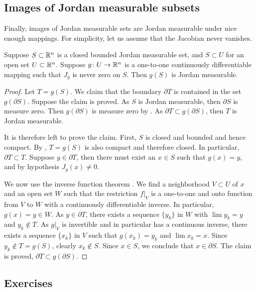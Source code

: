 \subsection{Images of Jordan measurable subsets}

Finally, images of Jordan measurable sets are Jordan measurable under
nice enough mappings.  For simplicity, let us assume that the Jacobian
never vanishes.

\begin{prop} \label{prop:imagejordanmeas}
Suppose $S \subset {\mathbb{R}}^n$ is a closed bounded Jordan measurable set,
and $S \subset U$ for an open set $U \subset {\mathbb{R}}^n$.
Suppose
$g \colon U \to {\mathbb{R}}^n$ is a one-to-one
continuously differentiable mapping such that
$J_g$ is never zero on $S$.
Then $g(S)$ is Jordan measurable.
\end{prop}

\begin{proof}
Let $T = g(S)$.
We claim that the boundary $\partial T$ is contained in the
set $g(\partial S)$.  Suppose the claim is proved.
As $S$ is Jordan measurable, then
$\partial S$ is measure zero.  Then  $g(\partial S)$ is measure
zero by .  As $\partial T \subset g(\partial
S)$, then $T$ is Jordan measurable.

It is therefore left to prove the claim.  First, $S$ is closed and bounded
and hence compact.  By 
,
$T = g(S)$ is
also compact and therefore closed.  In particular, $\partial T \subset T$.
Suppose $y \in \partial T$, then there must exist an
$x \in S$
such that $g(x) = y$, and by hypothesis $J_g(x) \not= 0$.

We now use the inverse function theorem .  We find 
a neighborhood $V \subset U$ of $x$ and an open set $W$ such that
the restriction $f|_V$ is a one-to-one and onto function from $V$ to $W$
with a continuously differentiable inverse.  In particular, $g(x) = y \in W$.
As $y \in \partial T$, there exists a sequence $\{ y_k \}$ in $W$ with
$\lim y_k = y$ and $y_k \notin T$.  As $g|_V$ is invertible and in
particular has a continuous inverse, there exists
a sequence $\{ x_k \}$ in $V$ such that $g(x_k) = y_k$ and $\lim x_k = x$.
Since $y_k \notin T = g(S)$, clearly $x_k \notin S$.  Since $x \in S$, we
conclude that $x \in \partial S$.  The claim is proved, $\partial T \subset
g(\partial S)$.
\end{proof}

\subsection{Exercises}


